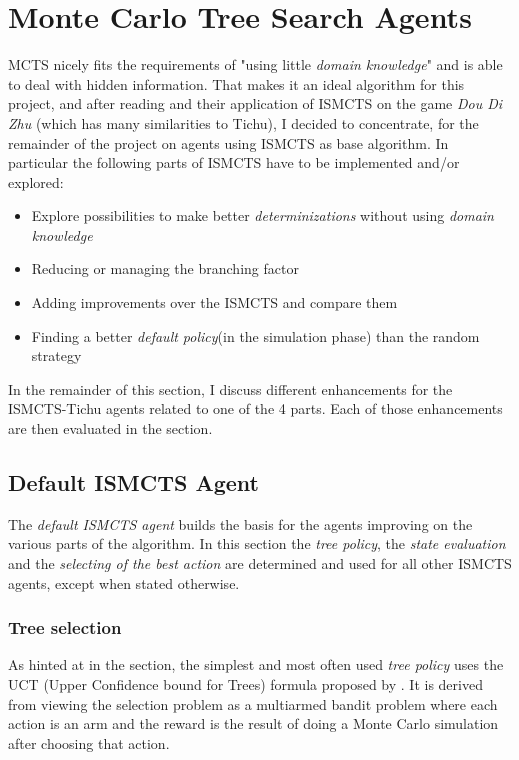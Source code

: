 \section{Monte Carlo Tree Search Agents}
MCTS nicely fits the requirements of "using little \textit{domain knowledge}" and is able to deal with hidden information. That makes it an ideal algorithm for this project, and after reading \cite{surveymcts, ismcts, whitehouse14} and their application of ISMCTS on the game \textit{Dou Di Zhu} (which has many similarities to Tichu), I decided to concentrate, for the remainder of the project on agents using ISMCTS as base algorithm.
In particular the following parts of ISMCTS have to be implemented and/or explored:
\begin{itemize}
    \vspace{-10px}
    \item Explore possibilities to make better \textit{determinizations} without using \textit{domain knowledge}
    \item Reducing or managing the branching factor
    \item Adding improvements over the ISMCTS and compare them
    \item Finding a better \textit{default policy}(in the simulation phase) than the random strategy
\end{itemize}

In the remainder of this section, I discuss different enhancements for the ISMCTS-Tichu agents related to one of the 4 parts. Each of those enhancements are then evaluated in the \textit{} section.

\subsection{Default ISMCTS Agent}
\label{sec:defaultmctsagent}
The \textit{default ISMCTS agent} builds the basis for the agents improving on the various parts of the algorithm. In this section the \textit{tree policy}, the \textit{state evaluation} and the \textit{selecting of the best action} are determined and used for all other ISMCTS agents, except when stated otherwise.

\subsubsection{Tree selection}
\label{sec:uct}
As hinted at in the \textit{} section, the simplest and most often used \textit{tree policy} uses the UCT (Upper Confidence bound for Trees) formula proposed by \cite{uct}.
It is derived from viewing the selection problem as a multiarmed bandit problem where each action is an arm and the reward is the result of doing a Monte Carlo simulation after choosing that action.

